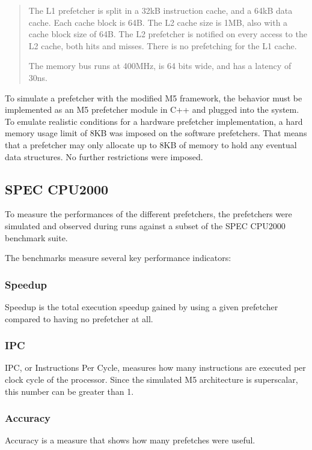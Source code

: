 \documentclass[a4paper]{IEEEtran}
\begin{document}
\begin{quote}
The L1 prefetcher is split in a 32kB instruction cache, and a 64kB data cache.
Each cache block is 64B.
The L2 cache size is 1MB, also with a cache block size of 64B.
The L2 prefetcher is notified on every access to the L2 cache, both hits and misses.
There is no prefetching for the L1 cache.

The memory bus runs at 400MHz, is 64 bits wide, and has a latency of 30ns.~\cite{m5userguide}
\end{quote}

To simulate a prefetcher with the modified M5 framework, the behavior must be implemented as an M5 prefetcher module in C++ and plugged into the system.
To emulate realistic conditions for a hardware prefetcher implementation, a hard memory usage limit of 8KB was imposed on the software prefetchers.
That means that a prefetcher may only allocate up to 8KB of memory to hold any eventual data structures.
No further restrictions were imposed.

\subsection{SPEC CPU2000}

To measure the performances of the different prefetchers, the prefetchers were simulated and observed during runs against a subset of the SPEC CPU2000 benchmark suite.~\cite{http://dl.acm.org/citation.cfm?id=621510}

The benchmarks measure several key performance indicators:

\subsubsection{Speedup}
Speedup is the total execution speedup gained by using a given prefetcher compared to having no prefetcher at all.

\subsubsection{IPC}
IPC, or Instructions Per Cycle, measures how many instructions are executed per clock cycle of the processor.
Since the simulated M5 architecture is superscalar, this number can be greater than 1.

\subsubsection{Accuracy}
Accuracy is a measure that shows how many prefetches were useful.
\end{document}
